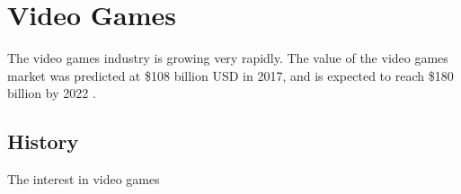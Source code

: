 \documentclass[a4paper,11.5pt]{report}
\numberwithin{figure}{section}
\numberwithin{table}{section}
\numberwithin{equation}{section}
\numberwithin{equation}{section}
\begin{document}
\section{Video Games}




The video games industry is growing very rapidly. The value of the video games market was predicted at \$108 billion USD in 2017, and is expected to reach \$180 billion by 2022 \cite{MarketResearchPaper, MarketResearch}.

\subsection{History}

The interest in video games 




\end{document}
